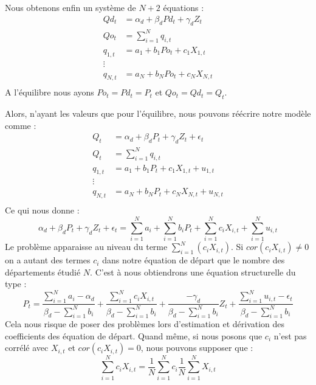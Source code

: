 \documentclass[11pt, a4paper]{article}
\begin{document}
Nous obtenons enfin un système de $N + 2$ équations : 
\begin{align*}
    Qd_t & = \alpha_d + \beta_d Pd_t + \gamma_d Z_t \\
    Qo_t & = \sum_{i = 1}^{N} q_{i,t} \\
    q_{1,t} & = a_1 + b_1 Po_{t} + c_1 X_{1,t} \\ 
    \vdots \\ 
    q_{N,t} & = a_N + b_N Po_{t} + c_N X_{N,t} \\
\end{align*}
A l'équilibre nous ayons $Po_t = Pd_t = P_t$ et $Qo_t = Qd_t = Q_t$.
\par
Alors, n'ayant les valeurs que pour l'équilibre, nous pouvons réécrire notre modèle comme :
\begin{align*}
  Q_t & = \alpha_d + \beta_d P_t + \gamma_d Z_t + \epsilon_t \\
  Q_t & = \sum_{i = 1}^{N} q_{i,t} \\
  q_{1,t} & = a_1 + b_1 P_{t} + c_1 X_{1,t} + u_{1,t}\\ 
  \vdots \\ 
  q_{N,t} & = a_N + b_N P_{t} + c_N X_{N,t} + u_{N,t}\\
\end{align*}
Ce qui nous donne : 
\begin{equation}
    \alpha_d + \beta_d P_t + \gamma_d Z_t + \epsilon_t = 
        \sum_{i = 1}^{N} a_i + \sum_{i = 1}^{N} b_i P_t + \sum_{i = 1}^{N} c_i X_{i,t} + \sum_{i = 1}^{N} u_{i,t}
\end{equation}
Le problème apparaisse au niveau du terme $\sum_{i = 1}^{N} (c_i X_{i,t})$. Si $cor(c_i X_{i,t}) \neq 0$ on a autant des termes $c_i$ dans notre équation de départ que le nombre des départements étudié $N$. 
C'est à nous obtiendrons une équation structurelle du type :
\begin{equation}
    P_t = \frac{\sum_{i = 1}^{N} a_i - \alpha_d}{\beta_d - \sum_{i = 1}^{N} b_i} + 
        \frac{\sum_{i = 1}^{N} c_i  X_{i,t}}{\beta_d - \sum_{i = 1}^{N} b_i} +
        \frac{-\gamma_d}{\beta_d - \sum_{i = 1}^{N} b_i} Z_t + 
        \frac{\sum_{i = 1}^{N} u_{i,t} - \epsilon_t}{\beta_d - \sum_{i = 1}^{N} b_i}
\end{equation}
Cela nous risque de poser des problèmes lors d'estimation et dérivation des coefficients des équation de départ.
Quand même, si nous posons que $c_i$ n'est pas corrélé avec $X_{i,t}$ et $cor(c_i X_{i,t}) = 0$, nous pouvons supposer que :
\begin{equation}
    \sum_{i = 1}^{N} c_i  X_{i,t} = \frac{1}{N} \sum_{i = 1}^{N} c_i \frac{1}{N} \sum_{i = 1}^{N} X_{i,t}
\end{equation}
\end{document}

